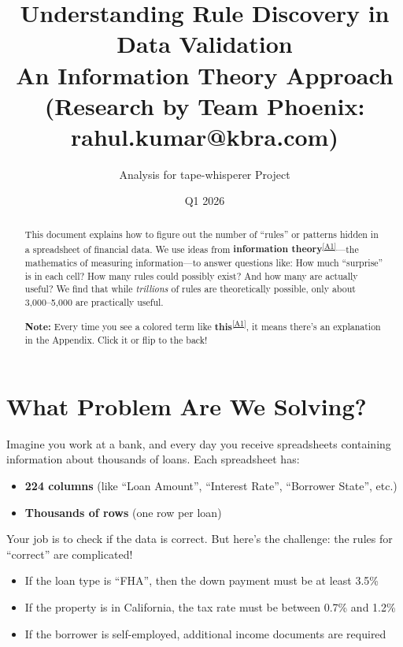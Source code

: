 \documentclass[11pt,a4paper]{article}
\title{\textbf{Understanding Rule Discovery in Data Validation}\\[0.5em]
\Large An Information Theory Approach\\[0.3em]
\normalsize (Research by Team Phoenix: rahul.kumar@kbra.com)}
\author{Analysis for tape-whisperer Project}
\date{Q1 2026}
\newcommand{\term}[2]{\textcolor{termcolor}{\textbf{#1}}\textsuperscript{\hyperref[#2]{[#2]}}}
\begin{document}
\maketitle

\begin{abstract}
This document explains how to figure out the number of ``rules'' or patterns hidden in a spreadsheet of financial data. We use ideas from \term{information theory}{A1}---the mathematics of measuring information---to answer questions like: How much ``surprise'' is in each cell? How many rules could possibly exist? And how many are actually useful? We find that while \textit{trillions} of rules are theoretically possible, only about 3,000--5,000 are practically useful.

\textbf{Note:} Every time you see a colored term like \term{this}{A1}, it means there's an explanation in the Appendix. Click it or flip to the back!
\end{abstract}

\tableofcontents
\newpage

\section{What Problem Are We Solving?}

Imagine you work at a bank, and every day you receive spreadsheets containing information about thousands of loans. Each spreadsheet has:
\begin{itemize}
    \item \textbf{224 columns} (like ``Loan Amount'', ``Interest Rate'', ``Borrower State'', etc.)
    \item \textbf{Thousands of rows} (one row per loan)
\end{itemize}

Your job is to check if the data is correct. But here's the challenge: the rules for ``correct'' are complicated!

\begin{infobox}
\begin{itemize}
    \item If the loan type is ``FHA'', then the down payment must be at least 3.5\%
    \item If the property is in California, the tax rate must be between 0.7\% and 1.2\%
    \item If the borrower is self-employed, additional income documents are required
\end{itemize}
\end{infobox}
\end{document}
